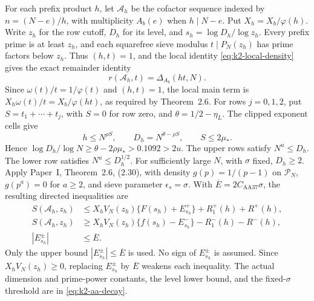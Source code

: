 For each prefix product \(h\), let \(\mathcal A_h\) be the cofactor
sequence indexed by \(n=(N-e)/h\), with multiplicity \(A_b(e)\) when
\(h\mid N-e\). Put \(X_h=X_b/\varphi(h)\). Write \(z_h\) for the
row cutoff, \(D_h\) for its level, and \(s_h=\log D_h/\log z_h\).
Every prefix prime is at least \(z_h\), and each squarefree sieve
modulus \(t\mid P_N(z_h)\) has prime factors below \(z_h\). Thus
\((h,t)=1\), and the local identity \eqref{eq:k2-local-density} gives
the exact remainder identity
\begin{equation}\label{eq:k2-aa-prefix-remainder}
 r(\mathcal A_h,t)=\Delta_{A_b}(ht,N).
\end{equation}
Since \(\omega(t)/t=1/\varphi(t)\) and \((h,t)=1\), the local main
term is \(X_h\omega(t)/t=X_b/\varphi(ht)\), as required by
Theorem~2.6. For rows \(j=0,1,2\), put
\(S=t_1+\cdots+t_j\), with \(S=0\) for row zero, and
\(\theta=1/2-\eta_L\). The clipped exponent cells give
\[
 h\le N^{\rho S},\qquad D_h=N^{\theta-\rho S},\qquad
 S\le2\mu_*.
\]
Hence \(\log D_h/\log N\ge\theta-2\rho\mu_*>0.1092>2u\).
The upper rows satisfy \(N^u\le D_h\). The lower row satisfies
\(N^u\le D_h^{1/2}\). For sufficiently large
\(N\), with \(\sigma\) fixed, \(D_h\ge2\).
Apply Paper~I, Theorem~2.6, (2.30), with density
\(g(p)=1/(p-1)\) on \(\mathcal P_N\), \(g(p^a)=0\) for \(a\ge2\),
and sieve parameter \(\epsilon_s=\sigma\). With
\(\overline E=2C_{\mathrm{AA37}}\sigma\), the resulting directed
inequalities are
\begin{equation}\label{eq:k2-aa-directed-estimates}
\begin{aligned}
 S(\mathcal A_h,z_h)
 &\le X_hV_N(z_h)\{F(s_h)+E^+_{s_h}\}+R_1^+(h)+R^+(h),\\
 S(\mathcal A_h,z_h)
 &\ge X_hV_N(z_h)\{f(s_h)-E^-_{s_h}\}-R_1^-(h)-R^-(h),\\
 |E^{\pm}_{s_h}|&\le\overline E.
\end{aligned}
\end{equation}
Only the upper bound \(|E^{\pm}_{s_h}|\le\overline E\) is used. No sign of
\(E^{\pm}_{s_h}\) is assumed. Since \(X_hV_N(z_h)\ge0\), replacing
\(E^{\pm}_{s_h}\) by \(\overline E\) weakens each inequality.
The actual dimension and prime-power constants, the level lower bound,
and the fixed-\(\sigma\) threshold are in
\eqref{eq:k2-aa-decay}.

